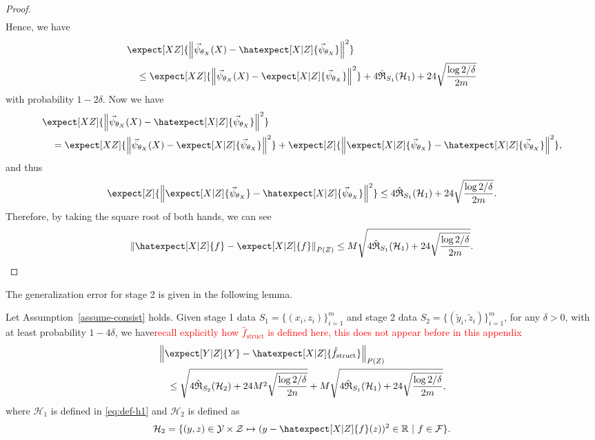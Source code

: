 \begin{proof}
\begin{align*}
\end{align*}
Hence, we have
\begin{align*}
    &\expect[XZ]{\left\|\vec{\psi}_{{\theta}_X}(X) - \hatexpect[X|Z]{\vec{\psi}_{{\theta}_X}}\right\|^2} \nonumber\\
    &\quad \leq  \expect[XZ]{\left\|\vec{\psi}_{{\theta}_X}(X) - \expect[X|Z]{\vec{\psi}_{{\theta}_X}}\right\|^2} +  4\hat{\mathfrak{R}}_{S_1}(\mathcal{H}_1) + 24\sqrt{\frac{\log 2/\delta}{2m}}
\end{align*}
with probability $1-2\delta$.
Now we have 
\begin{align*}
    &\expect[XZ]{\left\|\vec{\psi}_{{\theta}_X}(X) - \hatexpect[X|Z]{\vec{\psi}_{{\theta}_X}}\right\|^2} \\
    &\quad =\expect[XZ]{\left\|\vec{\psi}_{{\theta}_X}(X) - \expect[X|Z]{\vec{\psi}_{{\theta}_X}}\right\|^2} + \expect[Z]{\left\|\expect[X|Z]{\vec{\psi}_{{\theta}_X}} - \hatexpect[X|Z]{\vec{\psi}_{{\theta}_X}}\right\|^2},
\end{align*}
and thus
\begin{align*}
    \expect[Z]{\left\|\expect[X|Z]{\vec{\psi}_{{\theta}_X}} - \hatexpect[X|Z]{\vec{\psi}_{{\theta}_X}}\right\|^2} \leq 4\hat{\mathfrak{R}}_{S_1}(\mathcal{H}_1) + 24\sqrt{\frac{\log 2/\delta}{2m}}.
\end{align*}
Therefore, by taking the square root of both hands, we can see
\begin{align*}
    \left\|\hatexpect[X|Z]{{f}} - \expect[X|Z]{{f}}\right\|_{P(Z)} \leq M\sqrt{4\hat{\mathfrak{R}}_{S_1}(\mathcal{H}_1) + 24\sqrt{\frac{\log 2/\delta}{2m}}}.
\end{align*}
\end{proof}

The generalization error for stage 2 is given in the following lemma.

\begin{lem}\label{lem:2}
    Let Assumption~\ref{assume-consist} holds. Given stage 1 data $S_1 = \{(x_i, z_i)\}_{i=1}^m$ and stage 2 data $S_2 = \{(\tilde y_i, \tilde z_i)\}_{i=1}^m$, for any $\delta>0$, with at least probability $1-4\delta$, we have\textcolor{red}{recall explicitly how $\hat{f}_{\mathrm{struct}}$ is defined here, this does not appear before in this appendix}
    \begin{align*}
        &\left\|\expect[Y|Z]{Y} - \hatexpect[X|Z]{\hat{f}_{\mathrm{struct}}}\right\|_{P(Z)} \\
        &\quad \leq \sqrt{4\hat{\mathfrak{R}}_{S_2}(\mathcal{H}_2) + 24M^2\sqrt{\frac{\log 2/\delta}{2n}}} + M\sqrt{4\hat{\mathfrak{R}}_{S_1}(\mathcal{H}_1) + 24 \sqrt{\frac{\log 2/\delta}{2m}}},
    \end{align*}
    where $\mathcal{H}_1$ is defined in \eqref{eq:def-h1} and $\mathcal{H}_2$ is defined as
    \begin{align}
        \mathcal{H}_2 = \{(y, z) \in \mathcal{Y} \times \mathcal{Z} \mapsto (y -  \hatexpect[X|Z]{f}(z))^2 \in \mathbb{R} ~|~  f \in \mathcal{F}\}. \label{eq:def-h2}
    \end{align}
\end{lem}

